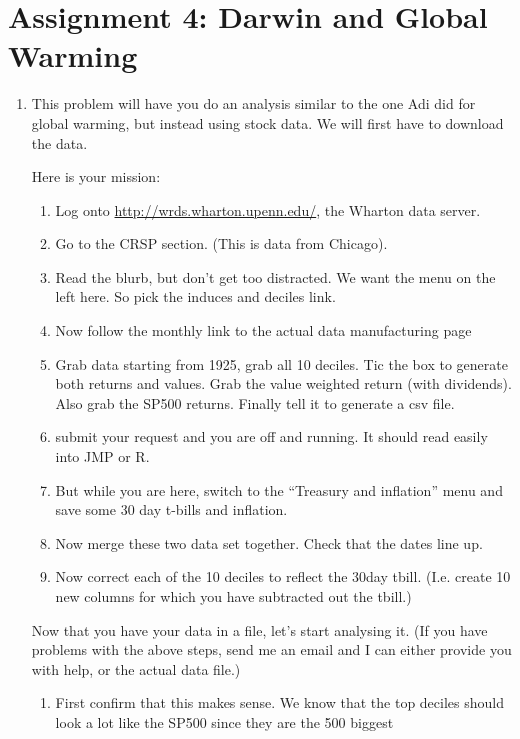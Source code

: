 \documentclass[11pt]{article}
\begin{document}
\section*{Assignment 4: Darwin and Global Warming}


\begin{enumerate}

\item This problem will have you do an analysis similar to the one Adi
did for global warming, but instead using stock data.  We will first
have to download the data.  

Here is your mission:
\begin{enumerate}[step 1:]
\item Log onto
\href{http://wrds.wharton.upenn.edu/}{http://wrds.wharton.upenn.edu/},
the Wharton data server.
\item Go to the CRSP section. (This is data from Chicago).
\item Read the blurb, but don't get too distracted.  We want the menu
on the left here.  So pick the induces and deciles link.
\item Now follow the monthly link to the actual data manufacturing page
\item Grab data starting from 1925, grab all 10 deciles.  Tic the box
to generate both returns and values.  Grab the
value weighted return (with dividends).  Also grab the SP500 returns.
Finally tell it to generate a csv file.
\item submit your request and you are off and running.  It should read
easily into JMP or R.
\item But while you are here, switch to the ``Treasury and inflation''
menu and save some 30 day t-bills and inflation.
\item Now merge these two data set together.  Check that the dates line up.
\item Now correct each of the 10 deciles to reflect the 30day tbill.
(I.e. create 10 new columns for which you have subtracted out the tbill.)
\end{enumerate}
Now that you have your data in a file, let's start analysing it.  (If
you have problems with the above steps, send me an email and I can
either provide you with help, or the actual data file.)
\begin{enumerate}
\item First confirm that this makes sense.  We know that the top
deciles should look a lot like the SP500 since they are the 500 biggest

\end{enumerate}
\end{enumerate}
\end{document}
